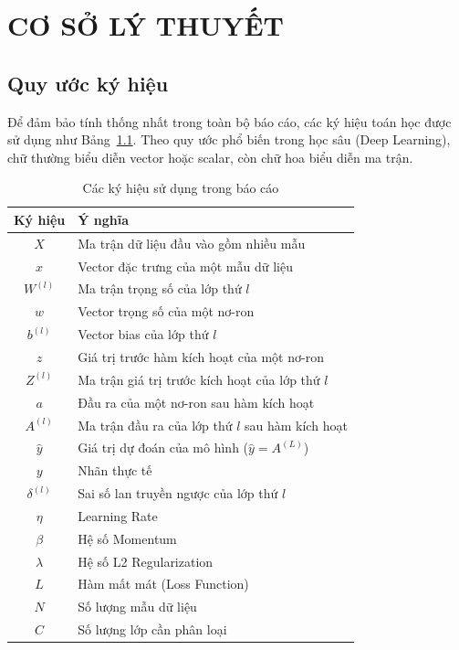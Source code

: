 \documentclass[12pt,a4paper]{report}
\begin{document}
\chapter{CƠ SỞ LÝ THUYẾT}

\section{Quy ước ký hiệu}
Để đảm bảo tính thống nhất trong toàn bộ báo cáo, các ký hiệu toán học được sử dụng như Bảng~\ref{tab:symbols}. Theo quy ước phổ biến trong học sâu (Deep Learning), chữ thường biểu diễn vector hoặc scalar, còn chữ hoa biểu diễn ma trận.

\begin{table}[H]
\centering
\caption{Các ký hiệu sử dụng trong báo cáo}
\label{tab:symbols}
\renewcommand{\arraystretch}{1.3}
\begin{tabular}{cl}
\hline
\textbf{Ký hiệu} & \textbf{Ý nghĩa} \\ \hline
$X$ & Ma trận dữ liệu đầu vào gồm nhiều mẫu \\
$x$ & Vector đặc trưng của một mẫu dữ liệu \\
$W^{(l)}$ & Ma trận trọng số của lớp thứ $l$ \\
$w$ & Vector trọng số của một nơ-ron \\
$b^{(l)}$ & Vector bias của lớp thứ $l$ \\
$z$ & Giá trị trước hàm kích hoạt của một nơ-ron \\
$Z^{(l)}$ & Ma trận giá trị trước kích hoạt của lớp thứ $l$ \\
$a$ & Đầu ra của một nơ-ron sau hàm kích hoạt \\
$A^{(l)}$ & Ma trận đầu ra của lớp thứ $l$ sau hàm kích hoạt \\
$\hat{y}$ & Giá trị dự đoán của mô hình ($\hat{y} = A^{(L)}$) \\
$y$ & Nhãn thực tế \\
$\delta^{(l)}$ & Sai số lan truyền ngược của lớp thứ $l$ \\
$\eta$ & Learning Rate \\
$\beta$ & Hệ số Momentum \\
$\lambda$ & Hệ số L2 Regularization \\
$L$ & Hàm mất mát (Loss Function) \\
$N$ & Số lượng mẫu dữ liệu \\
$C$ & Số lượng lớp cần phân loại \\
\hline
\end{tabular}
\end{table}
\end{document}
